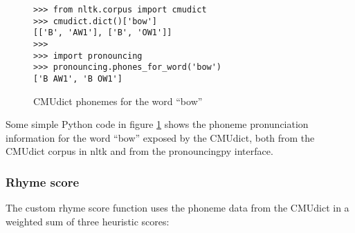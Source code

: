 \documentclass[11pt,a4paper]{article}
\begin{document}
\begin{figure}
\begin{Verbatim}[fontsize=\small]
>>> from nltk.corpus import cmudict
>>> cmudict.dict()['bow']
[['B', 'AW1'], ['B', 'OW1']]
>>>
>>> import pronouncing
>>> pronouncing.phones_for_word('bow')
['B AW1', 'B OW1']
\end{Verbatim}
\caption{CMUdict phonemes for the word ``bow''}
\label{fig:cmudict}
\end{figure}

Some simple Python code in figure \ref{fig:cmudict} shows the phoneme pronunciation information for the word ``bow'' exposed by the CMUdict, both from the CMUdict corpus in nltk and from the pronouncingpy interface.

\subsubsection{Rhyme score}
\label{sec:rhymescore}
The custom rhyme score function uses the phoneme data from the CMUdict in a weighted sum of three heuristic scores:
\end{document}
